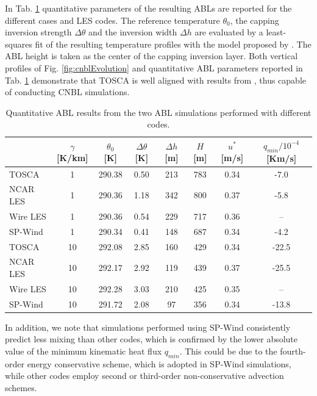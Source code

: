 \documentclass[journal abbreviation, manuscript]{copernicus}
\begin{document}
In Tab. \ref{tab:cnblEvolution} quantitative parameters of the resulting ABLs are reported for the different cases and LES codes. The reference temperature $\theta_0$, the capping inversion strength $\Delta\theta$ and the inversion width $\Delta h$ are evaluated by a least-squares fit of the resulting temperature profiles with the model proposed by \cite{2004_RampanelliZardi}. The ABL height is taken as the center of the capping inversion layer. Both vertical profiles of Fig. \ref{fig:cnblEvolution} and quantitative ABL parameters reported in Tab. \ref{tab:cnblEvolution} demonstrate that TOSCA is well aligned with results from \cite{2014_Pedersen, 2013_AbkarPortèAgel}, thus capable of conducting CNBL simulations.
\begin{table}[H]
	\begin{center}
		\begin{tabular}{l c c c c c c c} 
			\hline
			 & $\gamma$ [K/km]& $\theta_0$ [K] & $\Delta\theta$ [K]& $\Delta h$ [m]& $H$ [m]& $u^*$ [m/s]& $q_{min}/10^{-4}$ [Km/s]\\
            \hline
			TOSCA & 1 & 290.38 & 0.50 & 213 & 783 & 0.34 & -7.0\\	
			NCAR LES & 1 & 290.36 & 1.18 & 342 & 800 & 0.37 & -5.8\\	
			Wire LES & 1 & 290.36 & 0.54 & 229 & 717 & 0.36 & --\\	
			SP-Wind & 1 & 290.34 & 0.41 & 148 & 687 & 0.34 & -4.2\\	
			\hline
			TOSCA & 10 & 292.08 & 2.85 & 160 & 429 & 0.34 & -22.5\\	
			NCAR LES & 10 & 292.17 & 2.92 & 119 & 439 & 0.37 & -25.5\\	
			Wire LES & 10 & 292.28 & 3.03 & 210 & 425 & 0.35 & --\\	
			SP-Wind & 10 & 291.72 & 2.08 & 97 & 356 & 0.34 & -13.8 \\			
		\end{tabular}
	\end{center}
	\caption{Quantitative ABL results from the two ABL simulations performed with different codes.}
	\label{tab:cnblEvolution}
\end{table}
In addition, we note that simulations performed using SP-Wind consistently predict less mixing than other codes, which is confirmed by the lower absolute value of the minimum kinematic heat flux $q_{min}$. This could be due to the fourth-order energy conservative scheme, which is adopted in SP-Wind simulations, while other codes employ second or third-order non-conservative advection schemes.
\end{document}
